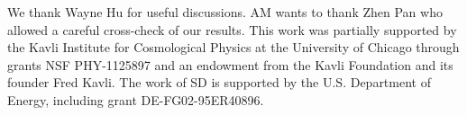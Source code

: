 \documentclass[aps,prd,reprint,superscriptaddress,nofootinbib]{revtex4-1}
\begin{document}
\begin{acknowledgments}
We thank Wayne Hu for useful discussions. AM wants to thank Zhen Pan who allowed a careful cross-check of our results.
This work was partially supported by the Kavli Institute for Cosmological Physics at the University of Chicago through grants NSF PHY-1125897 and an endowment from the Kavli Foundation and its founder Fred Kavli.
The work of SD is supported by the U.S. Department of Energy, including grant DE-FG02-95ER40896.
\end{acknowledgments}


\end{document}

